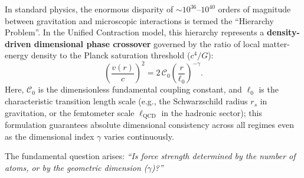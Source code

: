 In standard physics, the enormous disparity of $\sim 10^{36}$--$10^{40}$ orders of magnitude between gravitation and microscopic interactions is termed the ``Hierarchy Problem''. In the Unified Contraction model, this hierarchy represents a \textbf{density-driven dimensional phase crossover} governed by the ratio of local matter-energy density to the Planck saturation threshold ($c^4/G$):
\begin{equation}
    \left( \frac{v(r)}{c} \right)^2 = 2 \, \mathcal{C}_0 \left( \frac{r}{\ell_0} \right)^{-\gamma}.
    \label{eq:master_formula_main}
\end{equation}
Here, $\mathcal{C}_0$ is the dimensionless fundamental coupling constant, and $\ell_0$ is the characteristic transition length scale (e.g., the Schwarzschild radius $r_s$ in gravitation, or the femtometer scale $\ell_{\mathrm{QCD}}$ in the hadronic sector); this formulation guarantees absolute dimensional consistency across all regimes even as the dimensional index $\gamma$ varies continuously.

The fundamental question arises: \textit{``Is force strength determined by the number of atoms, or by the geometric dimension ($\gamma$)?''}


